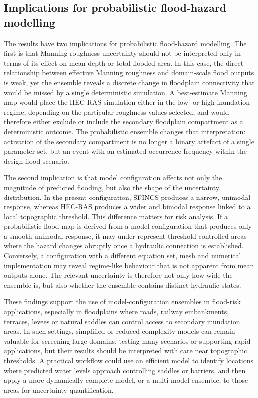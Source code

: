\documentclass[a4paper,fleqn]{cas-sc}
\newcommand{\sfincs}{\textsc{SFINCS}}
\newcommand{\hecras}{\textsc{HEC-RAS}}
\begin{document}
\subsection{Implications for probabilistic flood-hazard modelling}\label{sec:res_implications}
The results have two implications for probabilistic flood-hazard modelling. The first is that Manning roughness uncertainty should not be interpreted only in terms of its effect on mean depth or total flooded area. In this case, the direct relationship between effective Manning roughness and domain-scale flood outputs is weak, yet the ensemble reveals a discrete change in floodplain connectivity that would be missed by a single deterministic simulation. A best-estimate Manning map would place the \hecras{} simulation either in the low- or high-inundation regime, depending on the particular roughness values selected, and would therefore either exclude or include the secondary floodplain compartment as a deterministic outcome. The probabilistic ensemble changes that interpretation: activation of the secondary compartment is no longer a binary artefact of a single parameter set, but an event with an estimated occurrence frequency within the design-flood scenario.

The second implication is that model configuration affects not only the magnitude of predicted flooding, but also the shape of the uncertainty distribution. In the present configuration, \sfincs{} produces a narrow, unimodal response, whereas \hecras{} produces a wider and bimodal response linked to a local topographic threshold. This difference matters for risk analysis. If a probabilistic flood map is derived from a model configuration that produces only a smooth unimodal response, it may under-represent threshold-controlled areas where the hazard changes abruptly once a hydraulic connection is established. Conversely, a configuration with a different equation set, mesh and numerical implementation may reveal regime-like behaviour that is not apparent from mean outputs alone. The relevant uncertainty is therefore not only how wide the ensemble is, but also whether the ensemble contains distinct hydraulic states.

These findings support the use of model-configuration ensembles in flood-risk applications, especially in floodplains where roads, railway embankments, terraces, levees or natural saddles can control access to secondary inundation areas. In such settings, simplified or reduced-complexity models can remain valuable for screening large domains, testing many scenarios or supporting rapid applications, but their results should be interpreted with care near topographic thresholds. A practical workflow could use an efficient model to identify locations where predicted water levels approach controlling saddles or barriers, and then apply a more dynamically complete model, or a multi-model ensemble, to those areas for uncertainty quantification.
\end{document}
